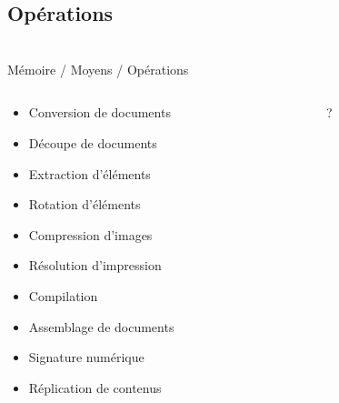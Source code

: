\subsection{Opérations}\begin{frame}
{\bititle\\Mémoire / Moyens / Opérations}
\begin{columns}\begin{column}{.5\textwidth}
\begin{itemize}
\item<1-> Conversion de documents
\item<2-> Découpe de documents
\item<3-> Extraction d’éléments
\item<4-> Rotation d’éléments
\item<5-> Compression d’images
\item<6-> Résolution d’impression
\item<7-> Compilation
\item<8-> Assemblage de documents
\item<9-> Signature numérique
\item<10-> Réplication de contenus
\end{itemize}
\end{column}\begin{column}{.5\textwidth}
?
\end{column}\end{columns}
\end{frame}
